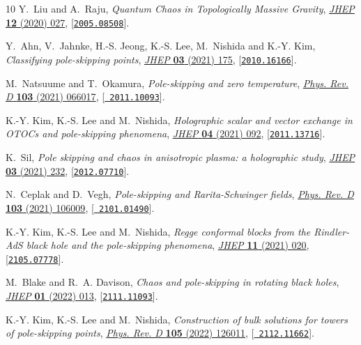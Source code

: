 \documentclass[11pt,a4paper]{article}
\begin{document}
\begin{thebibliography}{10}
Y.~Liu and A.~Raju, \emph{{Quantum Chaos in Topologically Massive Gravity}},
  \href{http://dx.doi.org/10.1007/JHEP12(2020)027}{\emph{JHEP} {\bf 12} (2020)
  027}, [\href{http://arxiv.org/abs/2005.08508}{{\tt 2005.08508}}].

Y.~Ahn, V.~Jahnke, H.-S. Jeong, K.-S. Lee, M.~Nishida and K.-Y. Kim,
  \emph{{Classifying pole-skipping points}},
  \href{http://dx.doi.org/10.1007/JHEP03(2021)175}{\emph{JHEP} {\bf 03} (2021)
  175}, [\href{http://arxiv.org/abs/2010.16166}{{\tt 2010.16166}}].

M.~Natsuume and T.~Okamura, \emph{{Pole-skipping and zero temperature}},
  \href{http://dx.doi.org/10.1103/PhysRevD.103.066017}{\emph{Phys. Rev. D} {\bf
  103} (2021) 066017}, [\href{http://arxiv.org/abs/2011.10093}{{\tt
  2011.10093}}].

K.-Y. Kim, K.-S. Lee and M.~Nishida, \emph{{Holographic scalar and vector
  exchange in OTOCs and pole-skipping phenomena}},
  \href{http://dx.doi.org/10.1007/JHEP04(2021)092}{\emph{JHEP} {\bf 04} (2021)
  092}, [\href{http://arxiv.org/abs/2011.13716}{{\tt 2011.13716}}].

K.~Sil, \emph{{Pole skipping and chaos in anisotropic plasma: a holographic
  study}}, \href{http://dx.doi.org/10.1007/JHEP03(2021)232}{\emph{JHEP} {\bf
  03} (2021) 232}, [\href{http://arxiv.org/abs/2012.07710}{{\tt 2012.07710}}].

N.~Ceplak and D.~Vegh, \emph{{Pole-skipping and Rarita-Schwinger fields}},
  \href{http://dx.doi.org/10.1103/PhysRevD.103.106009}{\emph{Phys. Rev. D} {\bf
  103} (2021) 106009}, [\href{http://arxiv.org/abs/2101.01490}{{\tt
  2101.01490}}].

K.-Y. Kim, K.-S. Lee and M.~Nishida, \emph{{Regge conformal blocks from the
  Rindler-AdS black hole and the pole-skipping phenomena}},
  \href{http://dx.doi.org/10.1007/JHEP11(2021)020}{\emph{JHEP} {\bf 11} (2021)
  020}, [\href{http://arxiv.org/abs/2105.07778}{{\tt 2105.07778}}].

M.~Blake and R.~A. Davison, \emph{{Chaos and pole-skipping in rotating black
  holes}}, \href{http://dx.doi.org/10.1007/JHEP01(2022)013}{\emph{JHEP} {\bf
  01} (2022) 013}, [\href{http://arxiv.org/abs/2111.11093}{{\tt 2111.11093}}].

K.-Y. Kim, K.-S. Lee and M.~Nishida, \emph{{Construction of bulk solutions for
  towers of pole-skipping points}},
  \href{http://dx.doi.org/10.1103/PhysRevD.105.126011}{\emph{Phys. Rev. D} {\bf
  105} (2022) 126011}, [\href{http://arxiv.org/abs/2112.11662}{{\tt
  2112.11662}}].


\end{thebibliography}
\end{document}
